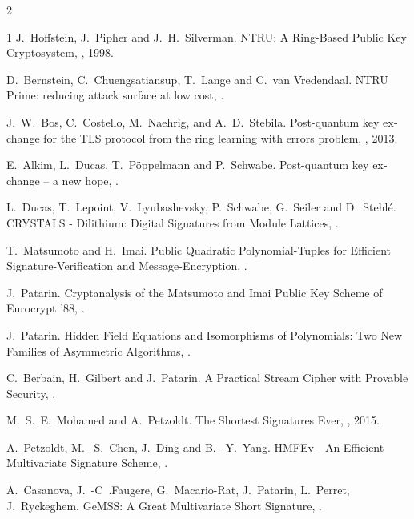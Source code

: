 \documentclass[a4paper,11pt]{article}
\begin{document}
\begin{otherlanguage}{english}
\begin{multicols}{2}
\begin{thebibliography}{1}
J.~Hoffstein, J.~Pipher and J.~H.~Silverman.
\newblock NTRU: A Ring-Based Public Key Cryptosystem,
, 1998.

D.~Bernstein, C.~Chuengsatiansup, T.~Lange and C.~van Vredendaal.
\newblock NTRU Prime: reducing attack surface at low cost,
.

J.~W.~Bos, C.~Costello, M.~Naehrig, and A.~D.~Stebila.
\newblock Post-quantum key exchange for the TLS protocol from the ring
learning with errors problem,
, 2013.

E.~Alkim, L.~Ducas, T.~Pöppelmann and P.~Schwabe.
\newblock Post-quantum key exchange – a new hope,
.

L.~Ducas, T.~Lepoint, V.~Lyubashevsky, P.~Schwabe, G.~Seiler and D.~Stehlé.
\newblock CRYSTALS - Dilithium: Digital Signatures from Module Lattices,
.

T.~Matsumoto and H.~Imai.
\newblock Public Quadratic Polynomial-Tuples for Efficient Signature-Verification and Message-Encryption,
.

J.~Patarin.
\newblock Cryptanalysis of the Matsumoto and Imai Public Key Scheme of Eurocrypt '88,
.

J.~Patarin.
\newblock Hidden Field Equations and Isomorphisms of Polynomials: Two New Families of Asymmetric Algorithms,
.

C.~Berbain, H.~Gilbert and J.~Patarin.
\newblock A Practical Stream Cipher with Provable Security,
.

M.~S.~E.~Mohamed and A.~Petzoldt.
\newblock The Shortest Signatures Ever,
, 2015.

A.~Petzoldt, M.~-S.~Chen, J.~Ding and B.~-Y.~Yang.
\newblock HMFEv - An Efficient Multivariate Signature Scheme,
.

A.~Casanova, J.~-C~.Faugere, G.~Macario-Rat, J.~Patarin, L.~Perret, J.~Ryckeghem.
\newblock GeMSS: A Great Multivariate Short Signature,
.


\end{thebibliography}
\end{multicols}
\end{otherlanguage}
\end{document}
